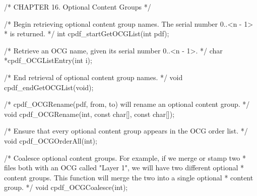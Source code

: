 /* CHAPTER 16. Optional Content Groups */

/* Begin retrieving optional content group names. The serial number 0..<n - 1>
 * is returned. */
int cpdf_startGetOCGList(int pdf);

/* Retrieve an OCG name, given its serial number 0..<n - 1>. */
char *cpdf_OCGListEntry(int i);

/* End retrieval of optional content group names. */
void cpdf_endGetOCGList(void);

/* cpdf_OCGRename(pdf, from, to) will rename an optional content group. */
void cpdf_OCGRename(int, const char[], const char[]);

/* Ensure that every optional content group appears in the OCG order list. */
void cpdf_OCGOrderAll(int);

/* Coalesce optional content groups. For example, if we merge or stamp two
 * files both with an OCG called "Layer 1", we will have two different optional
 * content groups. This function will merge the two into a single optional
 * content group. */
void cpdf_OCGCoalesce(int);

